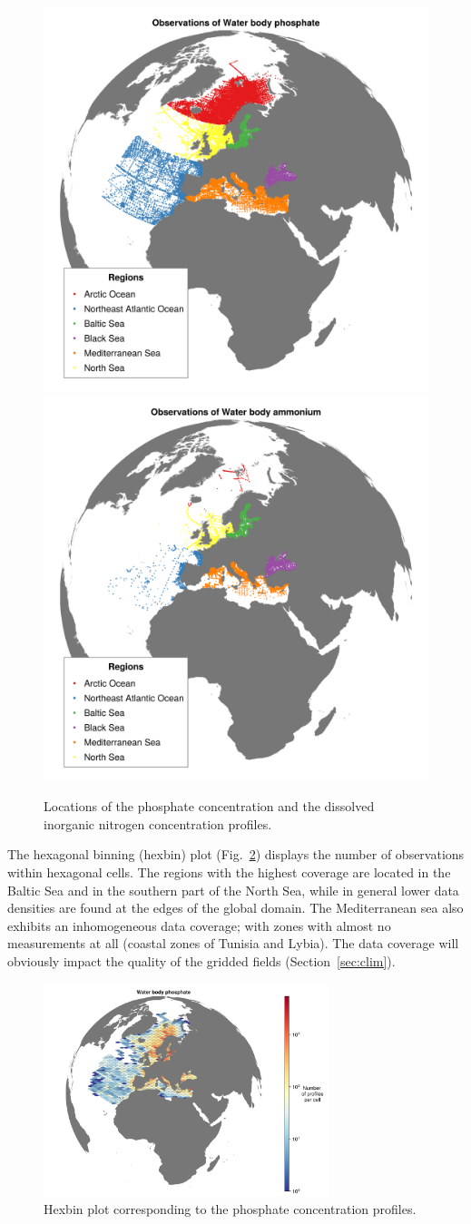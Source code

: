 \documentclass[essd, manuscript]{copernicus}
\begin{document}
\begin{figure}[t]
\includegraphics[width=.49\textwidth]{observations_Water_body_phosphate.png}\includegraphics[width=.49\textwidth]{observations_Water_body_ammonium.png}
\caption{Locations of the phosphate concentration and the dissolved inorganic nitrogen concentration profiles.\label{fig:phosphatedata}}
\end{figure}

The hexagonal binning (hexbin) plot (Fig.~\ref{fig:phosphatedatahexbin}) displays the number of observations within hexagonal cells. The regions with the highest coverage are located in the Baltic Sea and in the southern part of the North Sea, while in general lower data densities are found at the edges of the global domain. The Mediterranean sea also exhibits an inhomogeneous data coverage; with zones with almost no measurements at all (coastal zones of Tunisia and Lybia). The data coverage will obviously impact the quality of the gridded fields (Section~\ref{sec:clim}).

\begin{figure}[t]
\includegraphics[width=8.3cm]{observations_Water_body_phosphate_hex.png}
\caption{Hexbin plot corresponding to the phosphate concentration profiles.\label{fig:phosphatedatahexbin}}
\end{figure}
\end{document}
